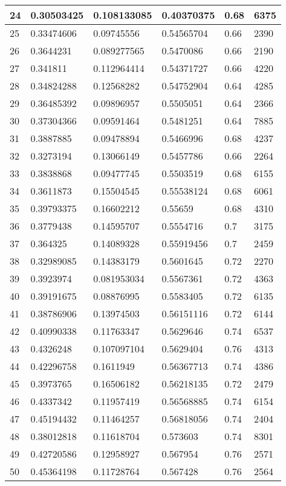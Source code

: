 \begin{longtable}{|l|l|l|l|l|l|}
24 & 0.30503425 & 0.108133085 & 0.40370375 & 0.68 & 6375 \\ \hline 
25 & 0.33474606 & 0.09745556 & 0.54565704 & 0.66 & 2390 \\ \hline 
26 & 0.3644231 & 0.089277565 & 0.5470086 & 0.66 & 2190 \\ \hline 
27 & 0.341811 & 0.112964414 & 0.54371727 & 0.66 & 4220 \\ \hline 
28 & 0.34824288 & 0.12568282 & 0.54752904 & 0.64 & 4285 \\ \hline 
29 & 0.36485392 & 0.09896957 & 0.5505051 & 0.64 & 2366 \\ \hline 
30 & 0.37304366 & 0.09591464 & 0.5481251 & 0.64 & 7885 \\ \hline 
31 & 0.3887885 & 0.09478894 & 0.5466996 & 0.68 & 4237 \\ \hline 
32 & 0.3273194 & 0.13066149 & 0.5457786 & 0.66 & 2264 \\ \hline 
33 & 0.3838868 & 0.09477745 & 0.5503519 & 0.68 & 6155 \\ \hline 
34 & 0.3611873 & 0.15504545 & 0.55538124 & 0.68 & 6061 \\ \hline 
35 & 0.39793375 & 0.16602212 & 0.55659 & 0.68 & 4310 \\ \hline 
36 & 0.3779438 & 0.14595707 & 0.5554716 & 0.7 & 3175 \\ \hline 
37 & 0.364325 & 0.14089328 & 0.55919456 & 0.7 & 2459 \\ \hline 
38 & 0.32989085 & 0.14383179 & 0.5601645 & 0.72 & 2270 \\ \hline 
39 & 0.3923974 & 0.081953034 & 0.5567361 & 0.72 & 4363 \\ \hline 
40 & 0.39191675 & 0.08876995 & 0.5583405 & 0.72 & 6135 \\ \hline 
41 & 0.38786906 & 0.13974503 & 0.56151116 & 0.72 & 6144 \\ \hline 
42 & 0.40990338 & 0.11763347 & 0.5629646 & 0.74 & 6537 \\ \hline 
43 & 0.4326248 & 0.107097104 & 0.5629404 & 0.76 & 4313 \\ \hline 
44 & 0.42296758 & 0.1611949 & 0.56367713 & 0.74 & 4386 \\ \hline 
45 & 0.3973765 & 0.16506182 & 0.56218135 & 0.72 & 2479 \\ \hline 
46 & 0.4337342 & 0.11957419 & 0.56568885 & 0.74 & 6154 \\ \hline 
47 & 0.45194432 & 0.11464257 & 0.56818056 & 0.74 & 2404 \\ \hline 
48 & 0.38012818 & 0.11618704 & 0.573603 & 0.74 & 8301 \\ \hline 
49 & 0.42720586 & 0.12958927 & 0.567954 & 0.76 & 2571 \\ \hline 
50 & 0.45364198 & 0.11728764 & 0.567428 & 0.76 & 2564 \\ \hline 
\end{longtable}